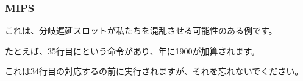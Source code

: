﻿\subsubsection{MIPS}



これは、分岐遅延スロットが私たちを混乱させる可能性のある例です。

たとえば、35行目にという命令があり、年に1900が加算されます。

これは34行目の対応するの前に実行されますが、それを忘れないでください。
